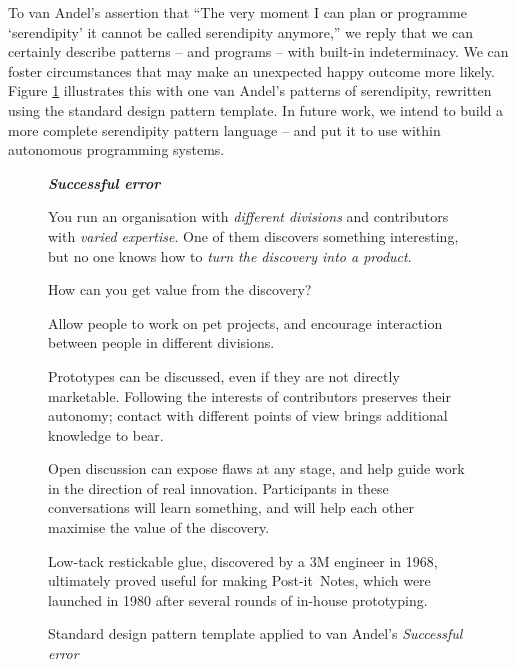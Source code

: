 To van Andel's assertion that ``The
very moment I can plan or programme `serendipity' it cannot be called
serendipity anymore,'' we reply that we can certainly describe
patterns -- and programs -- with built-in indeterminacy.  We can
foster circumstances that may make an unexpected happy outcome more
likely.  Figure \ref{fig:va-pattern-figure} illustrates this with one
van Andel's patterns of serendipity, rewritten using the standard
design pattern template.  In future work, we intend to build a more
complete serendipity pattern language -- and put it to use within
autonomous programming systems.



\begin{figure}[!h]
\begin{mdframed}
\vspace{2mm}
\textbf{\emph{Successful error}}~
\begin{description}[leftmargin=0\parindent,labelindent=0em,itemsep=2pt]
\item[{Context.}] You run an organisation with {\sl different
  divisions} and contributors with {\sl varied expertise}.  One of
  them discovers something interesting, but no one knows how to {\sl
    turn the discovery into a product}.
\item[{Problem.}]  How can you get value from the discovery?
\item[{Solution.}] Allow people to work on pet projects, and encourage
  interaction between people in different divisions.
\item[{Rationale.}] Prototypes can be discussed, even if they are not
  directly marketable.  Following the interests of contributors
  preserves their autonomy; contact with different points of view
  brings additional knowledge to bear.
\item[{Resolution.}] 
Open discussion can
  expose flaws at any stage, and help guide work in the direction of
  real innovation.  Participants in these conversations
  will learn something, and will help each other maximise the value of
  the discovery.  
\item[{Example.}] Low-tack restickable glue, discovered by a 3M
  engineer in 1968, ultimately proved useful for making
  Post-it\texttrademark\ Notes, which were launched in 1980 after
  several rounds of in-house prototyping.
\end{description}
\vspace{-1mm}
\end{mdframed}
\caption{Standard design pattern template applied to van Andel's \em{Successful error}\label{fig:va-pattern-figure}}
\end{figure}
